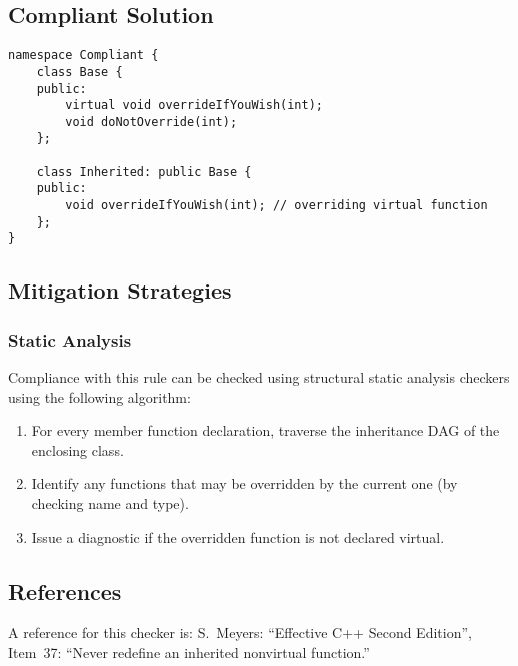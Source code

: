 \subsection{Compliant Solution}

\begin{verbatim}
namespace Compliant {
    class Base {
    public:
        virtual void overrideIfYouWish(int);
        void doNotOverride(int);
    };

    class Inherited: public Base {
    public:
        void overrideIfYouWish(int); // overriding virtual function
    };
}
\end{verbatim}

\subsection{Mitigation Strategies}
\subsubsection{Static Analysis} 

Compliance with this rule can be checked using structural static analysis checkers using the following algorithm:

\begin{enumerate}
\item For every member function declaration, traverse the inheritance DAG of
the enclosing class.
\item Identify any functions that may be overridden by the current one (by
checking name and type).
\item Issue a diagnostic if the overridden function is not declared virtual.
\end{enumerate}

\subsection{References}

A reference for this checker is: S.~Meyers: ``Effective C++ Second Edition'',
Item~37: ``Never redefine an inherited nonvirtual function.''
